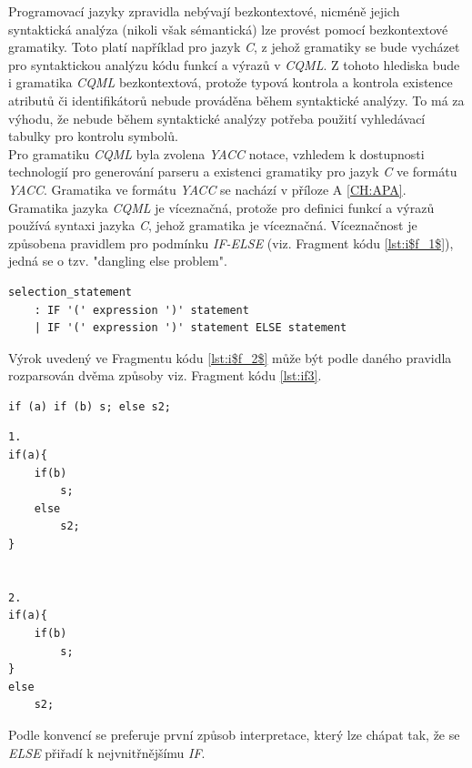 \documentclass[11pt,twoside,a4paper]{book}
\begin{document}
Programovací jazyky zpravidla nebývají bezkontextové, nicméně jejich syntaktická analýza (nikoli však sémantická) lze provést pomocí bezkontextové gramatiky. Toto platí například pro jazyk \textit{C}, z jehož gramatiky se bude vycházet pro syntaktickou analýzu kódu funkcí a výrazů v \textit{CQML}. Z tohoto hlediska bude i gramatika \textit{CQML} bezkontextová, protože typová kontrola a kontrola existence atributů či identifikátorů nebude prováděna během syntaktické analýzy. To má za výhodu, že nebude během syntaktické analýzy potřeba použití vyhledávací tabulky pro kontrolu symbolů.\\
Pro gramatiku \textit{CQML} byla zvolena \textit{YACC} notace, vzhledem k dostupnosti technologií pro generování parseru a existenci gramatiky pro jazyk \textit{C} ve formátu \textit{YACC}. Gramatika ve formátu \textit{YACC} se nachází v příloze A \ref{CH:APA}.\\
Gramatika jazyka \textit{CQML} je víceznačná, protože pro definici funkcí a výrazů používá syntaxi jazyka \textit{C}, jehož gramatika je víceznačná. Víceznačnost je způsobena pravidlem pro podmínku \textit{IF-ELSE} (viz. Fragment kódu \ref{lst:i$f_1$}), jedná se o tzv. "dangling else problem".\\
\begin{lstlisting}[frame=single,caption=Víceznačné \textit{IF-ELSE} pravidlo gramatiky.,label=lst:i$f_1$]
selection_statement
	: IF '(' expression ')' statement
	| IF '(' expression ')' statement ELSE statement 
\end{lstlisting}
Výrok uvedený ve Fragmentu kódu \ref{lst:i$f_2$} může být podle daného pravidla rozparsován dvěma způsoby viz. Fragment kódu \ref{lst:if3}.
\begin{lstlisting}[frame=single,caption=Příklad víceznačného výroku \textit{IF}-\textit{ELSE},label=lst:i$f_2$]
if (a) if (b) s; else s2;
\end{lstlisting}

\begin{lstlisting}[frame=single,caption=Možnosti interpretace víceznačného výroku IF-ELSE,label=lst:if3]
1.
if(a){
	if(b)
		s;
	else
		s2;
}


2.
if(a){
	if(b)
		s;
}
else
	s2;
\end{lstlisting}
Podle konvencí se preferuje první způsob interpretace, který lze chápat tak, že se \textit{ELSE} přiřadí k nejvnitřnějšímu \textit{IF}.
\end{document}
